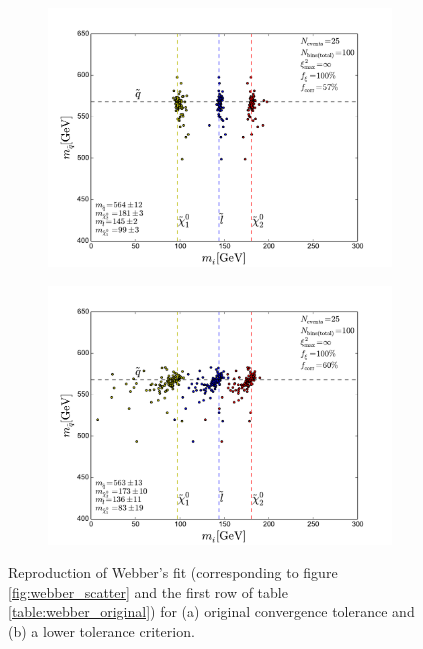 \documentclass[twoside,english]{uiofysmaster}
\begin{document}
\begin{figure}[hbt]
	\centering
	\begin{subfigure}[b]{0.6\textwidth}
		\includegraphics[width=\textwidth]{figures/webber_rec_table/webber_HW-rec_hightol_nocut.pdf} 
		\caption{ }
	\end{subfigure}

	\begin{subfigure}[b]{0.6\textwidth}
		\includegraphics[width=\textwidth]{figures/webber_rec_table/webber_HW-rec_nocut.pdf}
		\caption{ } 
	\end{subfigure}
	\caption{Reproduction of Webber's fit (corresponding to figure \ref{fig:webber_scatter} and the first row of table \ref{table:webber_original}) for (a) original convergence tolerance and (b) a lower tolerance criterion.}
	\label{fig:webber_rec_scatter_tolerance-comparison}
\end{figure}
\end{document}
